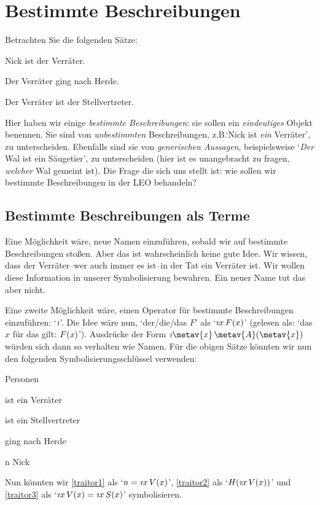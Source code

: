 \chapter{Bestimmte Beschreibungen}\label{subsec.defdesc}
Betrachten Sie die folgenden Sätze:
	\begin{earg}
		\item[\ex{traitor1}] Nick ist der Verräter.
		\item[\ex{traitor2}] Der Verräter ging nach Herde.
		\item[\ex{traitor3}] Der Verräter ist der Stellvertreter. 
	\end{earg}
Hier haben wir einige \emph{bestimmte Beschreibungen}: sie sollen ein \emph{eindeutiges} Objekt benennen. Sie sind von \emph{unbestimmten} Beschreibungen, z.B.\@ `Nick  ist \emph{ein} Verräter', zu unterscheiden. Ebenfalls sind sie von \emph{generischen Aussagen}, beispielsweise `\emph{Der} Wal ist ein Säugetier', zu unterscheiden (hier ist es unangebracht zu fragen, \emph{welcher} Wal gemeint ist). Die Frage die sich uns stellt ist: wie sollen wir bestimmte Beschreibungen in der LEO behandeln?


\section{Bestimmte Beschreibungen als Terme}
Eine Möglichkeit wäre, neue Namen einzuführen, sobald wir auf bestimmte Beschreibungen sto{\ss}en. Aber das ist wahrscheinlich keine gute Idee. Wir wissen, dass der Verräter--wer auch immer es ist--in der Tat ein Verräter ist. Wir wollen diese Information in unserer Symbolisierung bewahren. Ein neuer Name tut das aber nicht.

Eine zweite Möglichkeit wäre, einen Operator für bestimmte Beschreibungen einzuführen: `$\maththe$'. Die Idee wäre nun, `der/die/das $F$' als `$\maththe x\,\atom{F}{x}$' (gelesen als: `das $x$ für das gilt: $\mathord{F}(x)$'). Ausdrücke der Form $\maththe \metav{x}\, \atom{\metav{A}}{\metav{x}}$ würden sich dann so verhalten wie Namen. Für die obigen Sätze könnten wir nun den folgenden Symbolisierungsschlüssel verwenden:
	\begin{ekey}
		\item[\text{Domäne}] Personen
		\item[\atom{V}{x}]  ist ein Verräter
		\item[\atom{S}{x}]  ist ein Stellvertreter
		\item[\atom{H}{x}]  ging nach Herde
		\item[n] Nick
	\end{ekey}
Nun könnten wir \ref{traitor1} als `$n = \maththe x\, \atom{V}{x}$', \ref{traitor2} als `$\atom{H}{\maththe x\,\atom{V}{x}}$' und \ref{traitor3} als `$\maththe x\, \atom{V}{x} = \maththe x\, \atom{S}{x}$' symbolisieren. 

